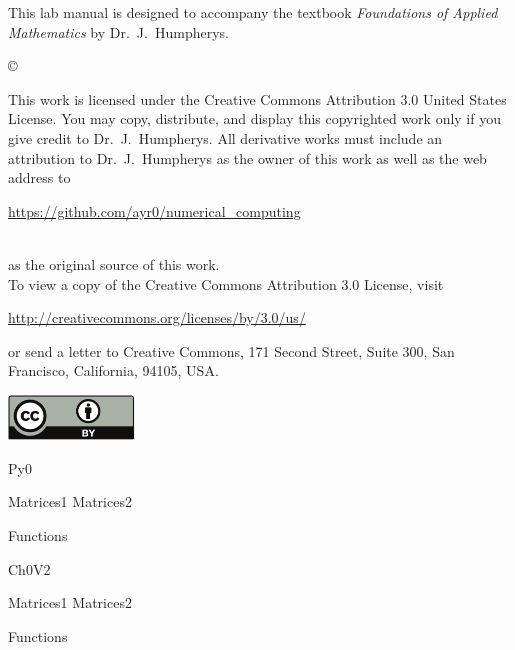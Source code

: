 \documentclass{newsiambook}
\begin{document}
\begin{thepreface}
This lab manual is designed to accompany the textbook \emph{Foundations of Applied Mathematics} by Dr.~J.~Humpherys.

\vfill
\copyright{This work is licensed under the Creative Commons Attribution 3.0 United States 
License.  You may copy, distribute, and display this copyrighted work only if you give 
credit to Dr.~J.~Humpherys. All derivative works must include an attribution to Dr.~J.~Humpherys as the owner of this work as well as the web address to 
\\\centerline{\url{https://github.com/ayr0/numerical_computing}}\\ as the original source of 
this 
work.\\To view a copy of the Creative Commons Attribution 3.0 License, 
visit\\\centerline{\url{http://creativecommons.org/licenses/by/3.0/us/}} or send a letter to 
Creative Commons, 171 Second Street, Suite 300, San Francisco, California, 94105, USA.}

\vfill
\centering\includegraphics[height=1.2cm]{by}
\vfill
\end{thepreface}

\setcounter{tocdepth}{1}
\tableofcontents

\mainmatter


\begin{python}
{Py0}
%

{Matrices1}
{Matrices2}
%
%

{Functions}
%
\end{python}

\begin{matlab}
{Ch0V2}
%

{Matrices1}
{Matrices2}
%
%

{Functions}
%
\end{matlab}
\end{document}
